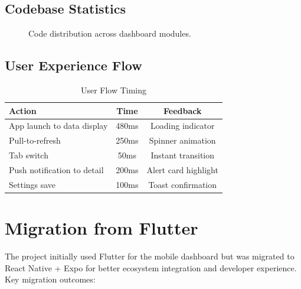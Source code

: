 \documentclass[conference]{IEEEtran}
\begin{document}
\subsection{Codebase Statistics}

\begin{figure}[H]
\centering
{}
\caption{Code distribution across dashboard modules.}
\label{fig:code_dist}
\end{figure}

\subsection{User Experience Flow}

\begin{table}[H]
\centering
\caption{User Flow Timing}
\label{tab:ux_flow}
\begin{tabular}{lcc}
\toprule
\textbf{Action} & \textbf{Time} & \textbf{Feedback} \\
\midrule
App launch to data display & 480ms & Loading indicator \\
Pull-to-refresh & 250ms & Spinner animation \\
Tab switch & 50ms & Instant transition \\
Push notification to detail & 200ms & Alert card highlight \\
Settings save & 100ms & Toast confirmation \\
\bottomrule
\end{tabular}
\end{table}

\section{Migration from Flutter}
The project initially used Flutter for the mobile dashboard but was migrated to React Native + Expo for better ecosystem integration and developer experience. Key migration outcomes:
\end{document}
